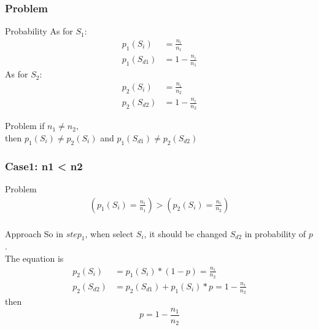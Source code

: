 \documentclass[notheorems, aspectratio=54]{beamer}
\begin{document}
\begin{frame}
    \frametitle{Problem}
    \begin{block}{Probability}
        As for $S_1$:
        \begin{equation}
            \begin{aligned}
                p_1(S_i) &= \frac{n_i}{n_1} \\
                p_1(S_{d1}) &= 1-\frac{n_i}{n_1}
            \end{aligned}
        \end{equation}
        As for $S_2$:
        \begin{equation}
            \begin{aligned}
                p_2(S_i) &= \frac{n_i}{n_2} \\
                p_2(S_{d2}) &= 1-\frac{n_i}{n_2}
            \end{aligned}
        \end{equation}
    \end{block}
    \begin{block}{Problem}
        if $n_1 \neq n_2$, \\
        then $p_1(S_i) \neq p_2(S_i)$ and $p_1(S_{d1}) \neq p_2(S_{d2})$
    \end{block}
\end{frame}

\begin{frame}
    \frametitle{Case1: n1 < n2}
    \begin{block}{Problem}
        \begin{equation}
            \begin{aligned}
                (p_1(S_i) = \frac{n_i}{n_1}) > (p_2(S_i) = \frac{n_i}{n_2}) \\
            \end{aligned}
        \end{equation}
    \end{block}
    \begin{block}{Approach}
        So in $step_1$, when select $S_i$, it should be changed $S_{d2}$ in probability of $p$. \\
        The equation is 
        \begin{equation}
            \begin{aligned}
                p_2(S_i) &= p_1(S_i)*(1-p) = \frac{n_i}{n_2} \\
                p_2(S_{d2}) &= p_2(S_{d1})+p_1(S_i)*{p} = 1-\frac{n_i}{n_2}
            \end{aligned}
        \end{equation}
        then
        $$p = 1-\frac{n_1}{n_2}$$
    \end{block}
\end{frame}
\end{document}
